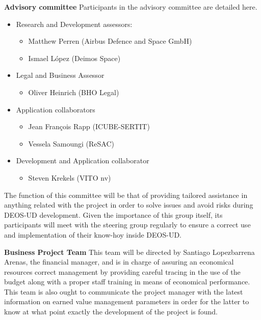 \textbf{Advisory committee}
\newline
\newline
Participants in the advisory committee are detailed here.
 \begin{itemize}
 	\item  Research and Development assessors: 
 	\begin{itemize}
 		\item Matthew Perren (Airbus Defence and Space GmbH)
 		\item Ismael López (Deimos Space)
 	\end{itemize}
 \item 	Legal and Business Assessor
 \begin{itemize}
 	\item Oliver Heinrich (BHO Legal)
  \end{itemize}
\item Application collaborators
\begin{itemize}
	\item Jean François Rapp (ICUBE-SERTIT)
	\item Vessela Samoungi (ReSAC)
\end{itemize}
\item Development and Application collaborator
 \begin{itemize}
	\item Steven Krekels (VITO nv)
\end{itemize}
 \end{itemize}

The function of this committee will be that of providing tailored assistance in anything related with the project in order to solve issues and avoid risks during DEOS-UD development. Given the importance of this group itself, its participants will meet with the steering group regularly to ensure a correct use and implementation of their know-hoy inside DEOS-UD. 

\textbf{Business Project Team}
\newline
\newline
This team will be directed by Santiago Lopezbarrena Arenas, the financial manager, and is in charge of assuring an economical resources correct management by providing careful tracing in the use of the budget along with a proper staff training in means of economical performance. This team is also ought to communicate the project manager with the latest information on earned value management parameters in order for the latter to know at what point exactly the development of the project is found.   
 
